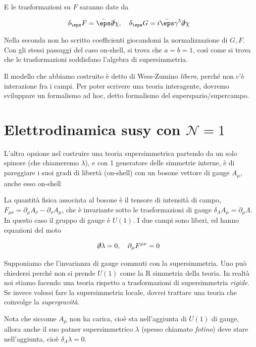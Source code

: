\documentclass{report}
\begin{document}
E le trasformazioni su \(F\) saranno date da 

\begin{align}
    \delta_\eps F = \bar{\eps}\slashed{\partial}\chi, \quad \delta_\eps G = i\bar{\eps}\gamma^5 \slashed{\partial}\chi
\end{align}

Nella seconda non ho scritto coefficienti giocandomi la normalizzazione di \(G, F\). Con gli stessi passaggi del caso on-shell, si trova che \(a = b = 1\), così come si trova che le trasformazioni soddisfano l'algebra di supersimmetria. 

Il modello che abbiamo costruito è detto di Wess-Zumino \emph{libero}, perché non c'è interazione fra i campi. Per poter scrivere una teoria interagente, dovremo sviluppare un formalismo ad hoc, detto formalismo del superspazio/supercampo. 

\section{Elettrodinamica susy con \(\mathcal{N}=1\)}

L'altra opzione nel costruire una teoria supersimmetrica partendo da un solo spinore (che chiameremo \(\lambda\)), e con 1 generatore delle simmetrie interne, è di pareggiare i suoi gradi di libertà (on-shell) con un bosone vettore di gauge \(A_\mu\), anche esso on-shell

La quantità fisica associata al bosone è il tensore di intensità di campo, \(F_{\mu\nu} = \partial_\mu A_\nu - \partial_\nu A_\mu\), che è invariante sotto le trasformazioni di gauge \(\delta_\Lambda A_\mu = \partial_\mu \Lambda\). In questo caso il gruppo di gauge è \(U(1)\). I due campi sono liberi, ed hanno equazioni del moto 

\begin{align}
    \slashed{\partial}\lambda = 0, \quad \partial_\mu F^{\mu\nu} = 0 
\end{align}

Supponiamo che l'invarianza di gauge commuti con la supersimmetria. Uno può chiedersi perché non si prende \(U(1)\) come la R simmetria della teoria. In realtà noi stiamo facendo una teoria rispetto a trasformazioni di supersimmetria \emph{rigide}. Se invece volessi fare la supersimmetria locale, dovrei trattare una teoria che coinvolge la \emph{supergravità}. 

Nota che siccome \(A_\mu\) non ha carica, cioè sta nell'aggiunta di \(U(1)\) di gauge, allora anche il suo patner supersimmetrico \(\lambda\) (spesso chiamato \emph{fotino}) deve stare nell'aggiunta, cioè \(\delta_\Lambda \lambda = 0\). 
\end{document}
